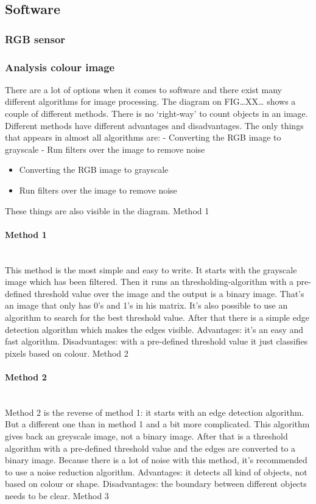 \documentclass{article}
\begin{document}
\subsection{Software}
\subsubsection{RGB sensor}
\subsubsection{Analysis colour image }

There are a lot of options when it comes to software and there exist many different algorithms for image processing. The diagram on FIG…XX… shows a couple of different methods. There is no ‘right-way’ to count objects in an image. Different methods have different advantages and disadvantages. The only things that appears in almost all algorithms are:
-	Converting the RGB image to grayscale
-	Run filters over the image to remove noise
\begin{itemize}
\item Converting the RGB image to grayscale
\item Run filters over the image to remove noise
\end{itemize}
These things are also visible in the diagram.
Method 1
\paragraph{Method 1}\mbox{}\\
This method is the most simple and easy to write. It starts with the grayscale image which has been filtered. Then it runs an thresholding-algorithm with a pre-defined threshold value over the image and the output is a binary image. That’s an image that only has 0’s and 1’s in his matrix.  It’s also possible to use an algorithm to search for the best threshold value.  After that there is a simple edge detection algorithm which makes the edges visible. 
Advantages: it’s an easy and fast algorithm.
Disadvantages: with a pre-defined threshold value it just classifies pixels based on colour. 
Method 2
\paragraph{Method 2}\mbox{}\\
Method 2 is the reverse of method 1: it starts with an edge detection algorithm. But a different one than in method 1 and a bit more complicated. This algorithm gives back an greyscale image, not a binary image. After that is a threshold algorithm with a pre-defined threshold value and the edges are converted to a binary image. Because there is a lot of noise with this method, it's recommended to use a noise reduction algorithm. 
Advantages: it detects all kind of objects, not based on colour or shape.
Disadvantages: the boundary between different objects needs to be clear.
Method 3
\end{document}
